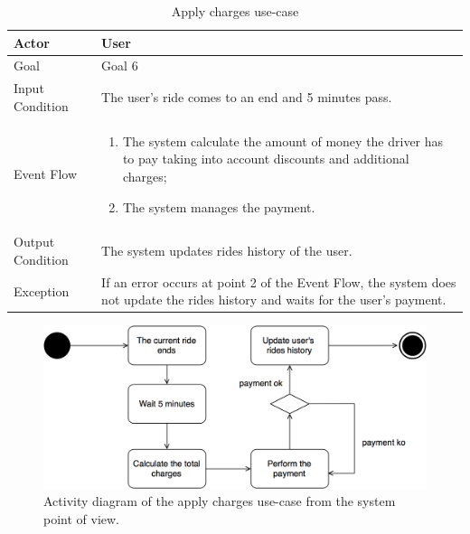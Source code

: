 \begin{table}[H]
\begin{center}
\begin{tabular}{p{} | p{}}
\hline
Actor & User\\
\hline
Goal & Goal 6\\
\hline
Input Condition & The user's ride comes to an end and 5 minutes pass.\\
\hline
Event Flow & 
\begin{enumerate}
\item The system calculate the amount of money the driver has to pay taking into account discounts and additional charges;
\item The system manages the payment.
\end{enumerate} \\
\hline
Output Condition & The system updates rides history of the user.\\
\hline
Exception & If an error occurs at point 2 of the Event Flow, the system does not update the rides history and waits for the user's payment.\\
\hline
\end{tabular}
\end{center}
\caption{Apply charges use-case}
\label{apply_charges_uc}
\end{table}

\begin{figure}[H]
\begin{center}
		\includegraphics[width=\textwidth]{./specific_requirements/features/diagrams/apply_charges_activity.png}
		\caption{Activity diagram of the apply charges use-case from the system point of view.}
		\label{app_charges_act}
\end{center}
\end{figure}